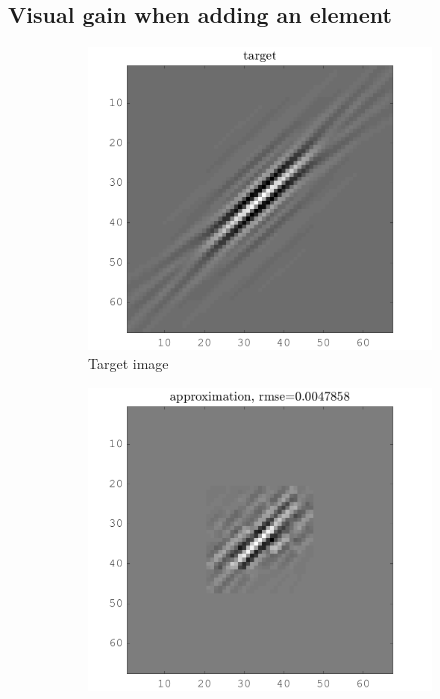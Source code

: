 \subsection{Visual gain when adding an element}

\begin{figure}[!ht]\centering
\begin{subfigure}[b]{0.32\textwidth}\centering
\includegraphics[width=\textwidth]{figures/before_after/xp_128x128_sc2_angl1_K3_S3_node4before_target.png}
	\caption{Target image}
\end{subfigure}
\begin{subfigure}[b]{0.32\textwidth}\centering
\includegraphics[width=\textwidth]{figures/before_after/xp_128x128_sc2_angl1_K3_S3_node4before_approx.png}

\end{subfigure}
\end{figure}
